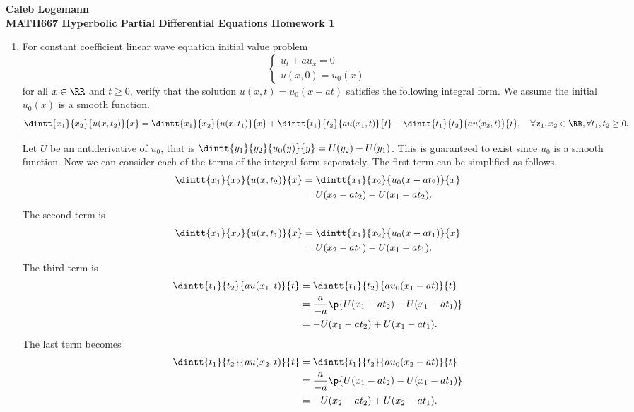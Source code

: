\documentclass[11pt, oneside]{article}
\begin{document}
\noindent \textbf{\Large{Caleb Logemann \\
MATH667 Hyperbolic Partial Differential Equations
Homework 1
}}

%
\begin{enumerate}
  \item %
    For constant coefficient linear wave equation initial value problem
    \[
      \begin{cases}
        u_t + a u_x = 0 \\
        u(x, 0) = u_0(x)
      \end{cases}
    \]
    for all $x \in \RR$ and $t \ge 0$, verify that the solution
    $u(x, t) = u_0(x - at)$ satisfies the following integral form.
    We assume the initial $u_0(x)$ is a smooth function.
    \[
      \dintt{x_1}{x_2}{u(x, t_2)}{x} = \dintt{x_1}{x_2}{u(x, t_1)}{x} +
      \dintt{t_1}{t_2}{au(x_1, t)}{t} - \dintt{t_1}{t_2}{au(x_2, t)}{t}, \quad
      \forall x_1, x_2 \in \RR, \forall t_1, t_2 \ge 0.
    \]

    Let $U$ be an antiderivative of $u_0$, that is
    $\dintt{y_1}{y_2}{u_0(y)}{y} = U(y_2) - U(y_1)$.
    This is guaranteed to exist since $u_0$ is a smooth function.
    Now we can consider each of the terms of the integral form seperately.
    The first term can be simplified as follows,
    \begin{align*}
      \dintt{x_1}{x_2}{u(x, t_2)}{x} &= \dintt{x_1}{x_2}{u_0(x - at_2)}{x} \\
      &= U(x_2 - at_2) - U(x_1 - at_2).
    \end{align*}
    The second term is
    \begin{align*}
      \dintt{x_1}{x_2}{u(x, t_1)}{x} &= \dintt{x_1}{x_2}{u_0(x - at_1)}{x} \\
      &= U(x_2 - at_1) - U(x_1 - at_1).
    \end{align*}
    The third term is
    \begin{align*}
      \dintt{t_1}{t_2}{au(x_1, t)}{t} &= \dintt{t_1}{t_2}{au_0(x_1 - at)}{t} \\
      &= \frac{a}{-a} \p{U(x_1 - at_2) - U(x_1 - at_1)} \\
      &= - U(x_1 - at_2) + U(x_1 - at_1).
    \end{align*}
    The last term becomes
    \begin{align*}
      \dintt{t_1}{t_2}{au(x_2, t)}{t} &= \dintt{t_1}{t_2}{au_0(x_2 - at)}{t} \\
      &= \frac{a}{-a} \p{U(x_1 - at_2) - U(x_1 - at_1)} \\
      &= -U(x_2 - at_2) + U(x_2 - at_1).
    \end{align*}


\end{enumerate}
\end{document}

